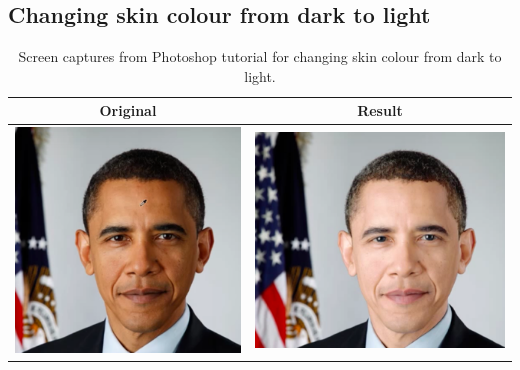 \subsection{Changing skin colour from dark to light \cite{photoshop:obama}}\label{app:photoshop_obama}
\begin{longtable}{|c|c|}
    \caption{Screen captures from Photoshop tutorial for changing skin colour from dark to light.}\\
    \hline
    Original & Result \\
    \hline
  \begin{minipage}{.29\textwidth}
    \includegraphics[width=\textwidth,height=\textheight,keepaspectratio]{images/obama_orig}
  \end{minipage} & 
  \begin{minipage}{.29\textwidth}
    \includegraphics[width=\textwidth,height=\textheight,keepaspectratio]{images/obama_res}

\end{minipage}
\end{longtable}
